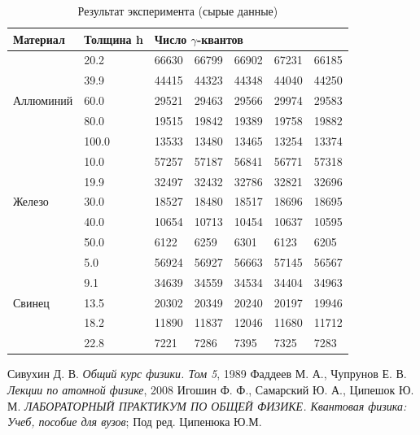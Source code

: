 \documentclass[a4paper]{article}
\begin{document}
\begin{table}[h]
	\centering
	\begin{tabular}{|l|l|l|l|l|l|l|}
		\hline
		Материал                   & Толщина h & \multicolumn{5}{l|}{Число $\gamma$-квантов} \\ \hline
		\multirow{5}{*}{Аллюминий} & 20.2      & 66630   & 66799   & 66902   & 67231  & 66185  \\ \cline{2-7} 
		& 39.9      & 44415   & 44323   & 44348   & 44040  & 44250  \\ \cline{2-7} 
		& 60.0      & 29521   & 29463   & 29566   & 29974  & 29583  \\ \cline{2-7} 
		& 80.0      & 19515   & 19842   & 19389   & 19758  & 19882  \\ \cline{2-7} 
		& 100.0     & 13533   & 13480   & 13465   & 13254  & 13374  \\ \hline
		\multirow{5}{*}{Железо}    & 10.0      & 57257   & 57187   & 56841   & 56771  & 57318  \\ \cline{2-7} 
		& 19.9      & 32497   & 32432   & 32786   & 32821  & 32696  \\ \cline{2-7} 
		& 30.0      & 18527   & 18480   & 18517   & 18696  & 18695  \\ \cline{2-7} 
		& 40.0      & 10654   & 10713   & 10454   & 10637  & 10595  \\ \cline{2-7} 
		& 50.0      & 6122    & 6259    & 6301    & 6123   & 6205   \\ \hline
		\multirow{5}{*}{Свинец}    & 5.0       & 56924   & 56927   & 56663   & 57145  & 56567  \\ \cline{2-7} 
		& 9.1       & 34639   & 34559   & 34534   & 34404  & 34963  \\ \cline{2-7} 
		& 13.5      & 20302   & 20349   & 20240   & 20197  & 19946  \\ \cline{2-7} 
		& 18.2      & 11890   & 11837   & 12046   & 11680  & 11712  \\ \cline{2-7} 
		& 22.8      & 7221    & 7286    & 7395    & 7325   & 7283   \\ \hline
	\end{tabular}
	\caption{Результат эксперимента (сырые данные)}
	\label{tab:raw}
\end{table}


\begin{thebibliography}{3}
	 Сивухин Д. В. \emph{Общий курс физики. Том 5}, 1989
	 Фаддеев М. А., Чупрунов Е. В. \emph{Лекции по атомной физике}, 2008
	 Игошин Ф. Ф., Самарский Ю. А., Ципешок Ю. М. \emph{ЛАБОРАТОРНЫЙ ПРАКТИКУМ ПО ОБЩЕЙ ФИЗИКЕ. Квантовая физика: Учеб, пособие для вузов}; Под ред. Ципенюка Ю.М.
\end{thebibliography}
\end{document}
